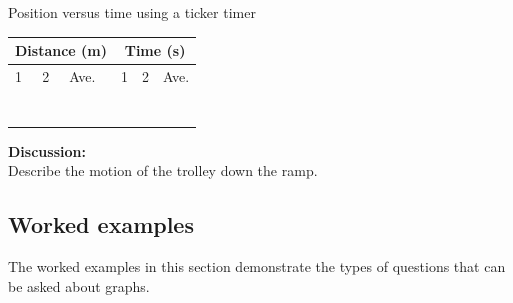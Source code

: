 \begin{f_experiment}{Position versus time using a ticker timer}
        \par 
          \begin{table}[H]
        \begin{center}
      \label{m38795*id7141349}
      \begin{tabular}{|l|l|l|l|l|l|}\hline
    \multicolumn{3}{|c|}{Distance (m)}
     &
    \multicolumn{3}{c|}{Time (s)}
     \\ \hline
        1 &
        2 &
        Ave. &
        1 &
        2 &
        Ave. \\ \hline
         &
         &
         &
         &
         &
      \\ \hline
         &
         &
         &
         &
         &
       \\ \hline
         &
         &
         &
         &
         &
       \\ \hline
         &
         &
         &
         &
         &
        \\ \hline
         &
         &
         &
         &
         &
        \\ \hline
         &
         &
         &
         &
         &
       \\ \hline
         &
         &
         &
         &
         &
      \\ \hline
    \end{tabular}
      \end{center}
\end{table}
    \par
        \label{m38795*id7172254}\noindent{}\textbf{Discussion:}\\
Describe the motion of the trolley down the ramp. 
\end{f_experiment}
\par \label{m38795*cid9}
            \subsection*{Worked examples}
            \nopagebreak
      \label{m38795*id73306}The worked examples in this section demonstrate the types of questions that can be asked about graphs.

